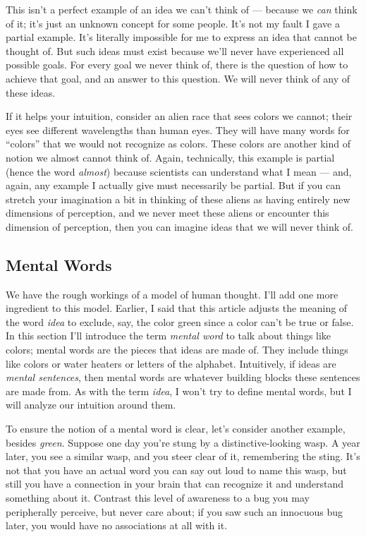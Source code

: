 \documentclass[11pt, oneside]{article}   	%
\begin{document}
This isn't a perfect example of an idea we can't think of --- because we {\em
can} think of it; it's just an unknown concept for some people.
It's not my fault I
gave a partial example.
It's literally impossible for me to express an idea that
cannot be thought of.
But such ideas must exist because we'll never
have experienced all possible goals.
For every goal we never think of,
there is the question of how to achieve that goal, and an answer to this
question. We will never think of any of these ideas.

If it helps your intuition, consider an alien race that sees colors we cannot;
their eyes see different wavelengths than human eyes.
They will have many words for ``colors''
that we would not recognize as colors. These colors are another kind of notion
we almost cannot think of.
Again, technically, this example is
partial (hence the word {\em almost})
because scientists can understand what I mean --- and, again, any
example I actually give must necessarily be partial. But if you can stretch your
imagination a bit in thinking of these aliens as having entirely new dimensions
of perception, and we never meet these aliens or encounter this dimension of
perception, then you can imagine ideas that we will never think of.


\subsection{Mental Words}\label{s_mental_words}

We have the rough workings of a model of human thought.
I'll add one more
ingredient to this model.
Earlier, I said that this article adjusts the meaning of the word
{\em idea} to exclude, say, the color green since a color
can't be true or false.
In this section I'll introduce the term {\em mental word} to talk about
things like colors;
mental words are
the pieces that ideas are made of.
They include things like
colors or water heaters or letters of the alphabet.
Intuitively, if
ideas are {\em mental sentences}, then mental words are whatever building
blocks these sentences are made from.
As with the term {\em idea}, I won't try to define mental words,
but I will analyze our intuition around them.

To ensure the notion of a mental word is clear, let's consider another example,
besides {\em green}.
Suppose one day you're stung
by a distinctive-looking wasp.
A year later, you see a similar wasp, and you
steer clear of it, remembering the sting.
It's not that you have an actual word you can say out loud to name this wasp,
but still you have a connection in your brain that can recognize it and
understand something about it.
Contrast this level of awareness to a bug you may peripherally perceive, but
never care about; if you saw such an innocuous bug later, you would have no
associations at all with it.
\end{document}
